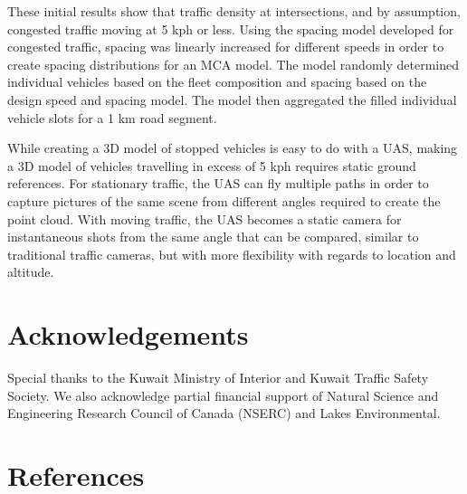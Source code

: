 \documentclass[preprint,12pt,a4paper,authoryear]{elsarticle}
\begin{document}
\begin{linenumbers}
These initial results show that traffic density at intersections, and by assumption, congested traffic moving at 5 kph or less. Using the spacing model developed for congested traffic, spacing was linearly increased for different speeds in order to create spacing distributions for an MCA model. The model randomly determined individual vehicles based on the fleet composition and spacing based on the design speed and spacing model. The model then aggregated the filled individual vehicle slots for a 1 km road segment. 

While creating a 3D model of stopped vehicles is easy to do with a UAS, making a 3D model of vehicles travelling in excess of 5 kph requires static ground references. For stationary traffic, the UAS can fly multiple paths in order to capture pictures of the same scene from different angles required to create the point cloud. With moving traffic, the UAS becomes a static camera for instantaneous shots from the same angle that can be compared, similar to traditional traffic cameras, but with more flexibility with regards to location and altitude.

\section{Acknowledgements}
Special thanks to the Kuwait Ministry of Interior and Kuwait Traffic Safety Society.  We also acknowledge partial financial support of Natural Science and Engineering Research Council of Canada (NSERC) and Lakes Environmental.
 
\section{References}

\end{linenumbers}
{}

\end{document}
